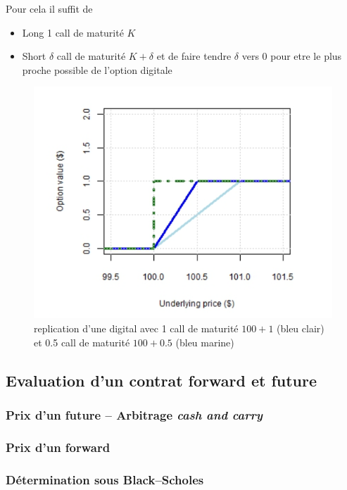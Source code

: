 \documentclass[a4paper]{article}
\begin{document}
Pour cela il suffit de 
\begin{itemize}
    \item Long 1 call de maturité $K$
    \item Short $\delta$ call de maturité $K+\delta$ et de faire tendre $\delta$ vers 0 pour etre le plus proche possible de l'option digitale
\end{itemize}
\begin{figure}[H]
    \centering
    \includegraphics{replicating.png}
    \caption{replication d'une digital avec 1 call de maturité $100+1$ (bleu clair) et 0.5 call de maturité $100+0.5$ (bleu marine)}
    \label{fig:enter-label}
\end{figure}

\subsection{Evaluation d'un contrat forward et future}

\subsubsection{Prix d'un future -- Arbitrage \textit{cash and carry}}



\subsubsection{Prix d'un forward}
\subsubsection{Détermination sous Black--Scholes}
\end{document}

